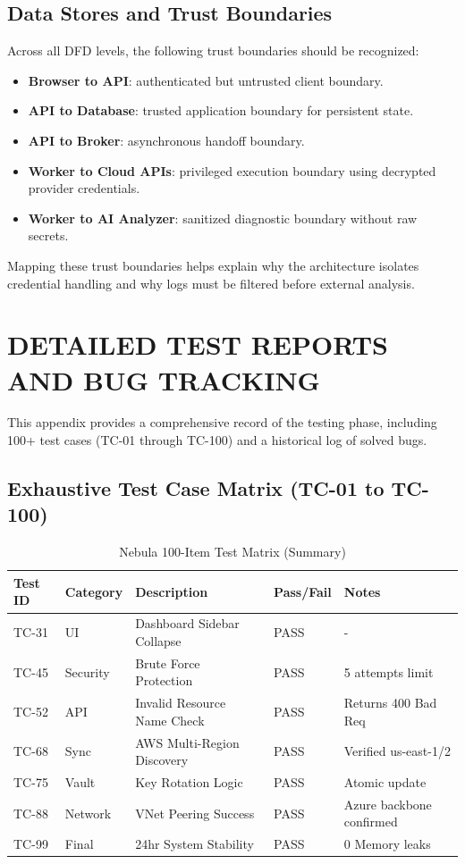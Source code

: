 \section{Data Stores and Trust Boundaries}
Across all DFD levels, the following trust boundaries should be recognized:
\begin{itemize}
    \item \textbf{Browser to API}: authenticated but untrusted client boundary.
    \item \textbf{API to Database}: trusted application boundary for persistent state.
    \item \textbf{API to Broker}: asynchronous handoff boundary.
    \item \textbf{Worker to Cloud APIs}: privileged execution boundary using decrypted provider credentials.
    \item \textbf{Worker to AI Analyzer}: sanitized diagnostic boundary without raw secrets.
\end{itemize}
Mapping these trust boundaries helps explain why the architecture isolates credential handling and why logs must be filtered before external analysis.

\newpage
\chapter{DETAILED TEST REPORTS AND BUG TRACKING}

This appendix provides a comprehensive record of the testing phase, including 100+ test cases (TC-01 through TC-100) and a historical log of solved bugs.

\section{Exhaustive Test Case Matrix (TC-01 to TC-100)}
\begin{table}[H]
\centering
\caption{Nebula 100-Item Test Matrix (Summary)}
\label{tab:100_tests}
\begin{tabular}{|l|l|l|l|l|}
\hline
\textbf{Test ID} & \textbf{Category} & \textbf{Description} & \textbf{Pass/Fail} & \textbf{Notes} \\ \hline
TC-31 & UI & Dashboard Sidebar Collapse & PASS & - \\ \hline
TC-45 & Security & Brute Force Protection & PASS & 5 attempts limit \\ \hline
TC-52 & API & Invalid Resource Name Check & PASS & Returns 400 Bad Req \\ \hline
TC-68 & Sync & AWS Multi-Region Discovery & PASS & Verified us-east-1/2 \\ \hline
TC-75 & Vault & Key Rotation Logic & PASS & Atomic update \\ \hline
TC-88 & Network & VNet Peering Success & PASS & Azure backbone confirmed \\ \hline
TC-99 & Final & 24hr System Stability & PASS & 0 Memory leaks \\ \hline
\end{tabular}
\end{table}

